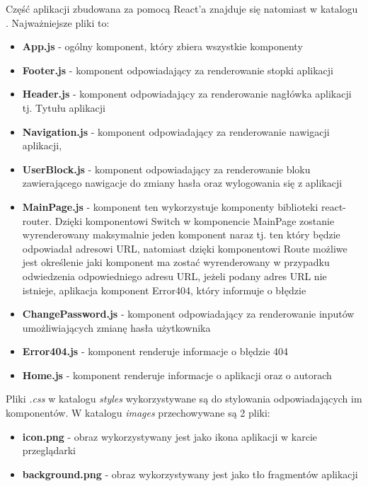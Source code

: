\documentclass[11pt]{article}
\begin{document}
Część aplikacji zbudowana za pomocą React'a znajduje się natomiast w katalogu . Najważniejsze pliki to:
\begin{itemize}
\item \textbf{App.js} - ogólny komponent, który zbiera wszystkie komponenty
\item \textbf{Footer.js} - komponent odpowiadający za renderowanie stopki aplikacji
\item \textbf{Header.js} - komponent odpowiadający za renderowanie nagłówka aplikacji tj. Tytułu aplikacji
\item \textbf{Navigation.js} - komponent odpowiadający za renderowanie nawigacji aplikacji,
\item \textbf{UserBlock.js} - komponent odpowiadający za renderowanie bloku zawierającego nawigacje do zmiany hasła oraz wylogowania się z aplikacji 
\item \textbf{MainPage.js} - komponent ten wykorzystuje komponenty biblioteki react-router. Dzięki komponentowi Switch w komponencie MainPage zostanie wyrenderowany maksymalnie jeden komponent naraz tj. ten który będzie odpowiadał adresowi URL, natomiast dzięki komponentowi Route możliwe jest określenie jaki komponent ma zostać wyrenderowany w przypadku odwiedzenia odpowiedniego adresu URL, jeżeli podany adres URL nie istnieje, aplikacja komponent Error404, który informuje o błędzie
\item \textbf{ChangePassword.js} - komponent odpowiadający za renderowanie inputów umożliwiających zmianę hasła użytkownika
\item \textbf{Error404.js} - komponent renderuje informacje o błędzie 404
\item \textbf{Home.js} - komponent renderuje informacje o aplikacji oraz o autorach 
\end{itemize}
Pliki \emph{.css} w katalogu \emph{styles} wykorzystywane są do stylowania odpowiadających im komponentów. \newline
W katalogu \emph{images} przechowywane są 2 pliki:
\begin{itemize}
\item \textbf{icon.png} - obraz wykorzystywany jest jako ikona aplikacji w karcie przeglądarki
\item \textbf{background.png} - obraz wykorzystywany jest jako tło fragmentów aplikacji
\end{itemize}
\end{document}
